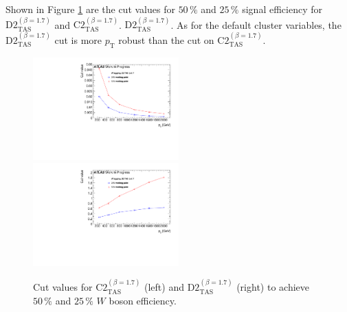 Shown in Figure \ref{fig:w_cut} are the cut values for $50\,\%$ and $25\,\%$ signal efficiency for $\text{D2}_{\text{TAS}}^{(\beta=1.7)}$ and $\text{C2}_{\text{TAS}}^{(\beta=1.7)}$. $\text{D2}_{\text{TAS}}^{(\beta=1.7)}$. As for the default cluster variables, the $\text{D2}_{\text{TAS}}^{(\beta=1.7)}$ cut is more $p_{\mathrm{T}}$ robust than the cut on $\text{C2}_{\text{TAS}}^{(\beta=1.7)}$. 
\begin{figure}
\includegraphics[width=0.5\textwidth]{sascha_input/plots/W/cut_value/c2_tas17.pdf} \hspace{1mm}
\includegraphics[width=0.5\textwidth]{sascha_input/plots/W/cut_value/d2_tas17.pdf}	
\caption{\footnotesize{Cut values for $\text{C2}_{\text{TAS}}^{(\beta=1.7)}$ (left) and $\text{D2}_{\text{TAS}}^{(\beta=1.7)}$ (right) to achieve $50\,\%$ and $25\,\%$ $W$ boson efficiency.}}\label{fig:w_cut}
\end{figure}

